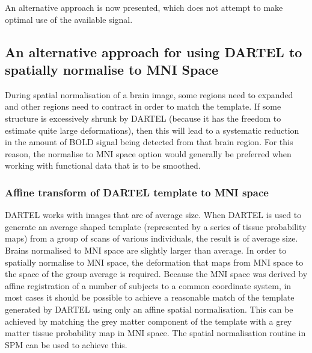 An alternative approach is now presented, which does not attempt to make optimal use of the available signal.

\subsection{An alternative approach for using DARTEL to spatially normalise to MNI Space}
During spatial normalisation of a brain image, some regions need to expanded and other regions need to contract in order to match the template.
If some structure is excessively shrunk by DARTEL (because it has the freedom to estimate quite large deformations), then this will lead to a systematic reduction in the amount of BOLD signal being detected from that brain region.
For this reason, the normalise to MNI space option would generally be preferred when working with functional data that is to be smoothed.

\subsubsection{Affine transform of DARTEL template to MNI space}
DARTEL works with images that are of average size.
When DARTEL is used to generate an average shaped template (represented by a series of tissue probability maps) from a group of scans of various individuals, the result is of average size.
Brains normalised to MNI space are slightly larger  than average.
In order to spatially normalise to MNI space, the deformation that maps from MNI space to the space of the group average is required.
Because the MNI space was derived by affine registration of a number of subjects to a common coordinate system, in most cases it should be possible to achieve a reasonable match of the template generated by DARTEL using only an affine spatial normalisation.
This can be achieved by matching the grey matter component of the template with a grey matter tissue probability map in MNI space.
The spatial normalisation routine in SPM can be used to achieve this.

